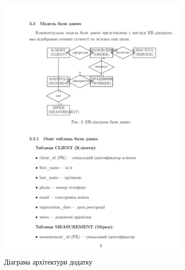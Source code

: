 \documentclass[14pt,a4paper]{extarticle}
\begin{document}
\begin{figure}[h!]
\centering
\includegraphics[width=0.85\textwidth]{diagrams/diagram-10.png}
\caption{Діаграма архітектури додатку}
\end{figure}
\end{document}
